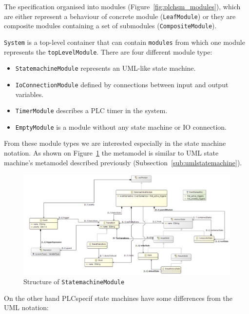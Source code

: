The specification organised into modules (Figure~\ref{fig:plchsm_modules}), which are either represent a behaviour of concrete module (\texttt{LeafModule}) or they are composite modules containing a set of submodules (\texttt{CompositeModule}).

\texttt{System} is a top-level container that can contain \texttt{modules} from which one module represents the \texttt{topLevelModule}. There are four different module type:

\begin{itemize}
	\item \texttt{StatemachineModule} represents an UML-like state machine.
	\item \texttt{IoConnectionModule} defined by connections between input and output variables.
	\item \texttt{TimerModule} describes a PLC timer in the system.
	\item \texttt{EmptyModule} is a module without any state machine or IO connection.
\end{itemize}

From these module types we are interested especially in the state machine notation. As shown on Figure~\ref{fig:plchsm_statemachine} the metamodel is similar to UML state machine's metamodel described previously (Subsection~\ref{sub:umlstatemachine}).

\begin{figure}[htp]
\centering
\includegraphics[scale=0.5]{figures/plchsm_statemachine}
\caption{Structure of \texttt{StatemachineModule} \cite{plcspecif}}
\label{fig:plchsm_statemachine}
\end{figure}

On the other hand PLCspecif state machines have some differences from the UML notation:

